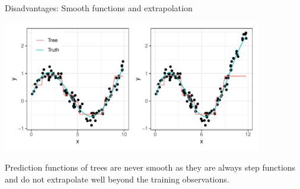 \documentclass[11pt,compress,t,notes=noshow, xcolor=table]{beamer}
\begin{document}
\begin{vbframe}{Disadvantages: Smooth functions and extrapolation}


{\centering \includegraphics[width=0.85\textwidth]{figure/not-smooth-extrapolation.pdf} 

}

Prediction functions of trees are never smooth as they are always step functions and do not extrapolate well beyond the training observations. %

\end{vbframe}
\end{document}
